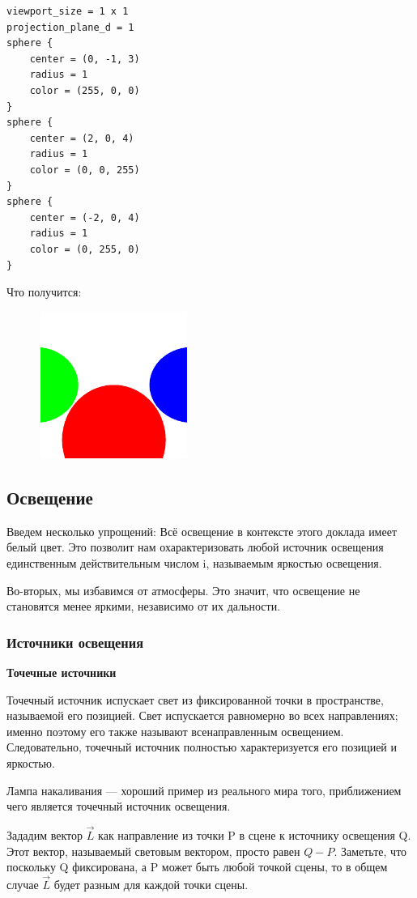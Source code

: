 \begin{lstlisting}
viewport_size = 1 x 1
projection_plane_d = 1
sphere {
    center = (0, -1, 3)
    radius = 1
    color = (255, 0, 0)  
}
sphere {
    center = (2, 0, 4)
    radius = 1
    color = (0, 0, 255)  
}
sphere {
    center = (-2, 0, 4)
    radius = 1
    color = (0, 255, 0)  
}
\end{lstlisting}

Что получится:

\includegraphics[width=7cm, height=4.8cm]{first_example.png}

\subsection{Освещение}
Введем несколько упрощений:
Всё освещение в контексте этого доклада имеет белый цвет. Это позволит нам охарактеризовать любой источник освещения единственным действительным числом i, называемым яркостью освещения.

Во-вторых, мы избавимся от атмосферы. Это значит, что освещение не становятся менее яркими, независимо от их дальности.
\subsubsection{Источники освещения}
\textbf{Точечные источники}

Точечный источник испускает свет из фиксированной точки в пространстве, называемой его позицией. Свет испускается равномерно во всех направлениях; именно поэтому его также называют всенаправленным освещением. Следовательно, точечный источник полностью характеризуется его позицией и яркостью.

Лампа накаливания — хороший пример из реального мира того, приближением чего является точечный источник освещения.

Зададим вектор $\vec{L}$ как направление из точки P в сцене к источнику освещения Q. Этот вектор, называемый световым вектором, просто равен $Q - P$. Заметьте, что поскольку Q фиксирована, а P может быть любой точкой сцены, то в общем случае $\vec{L}$ будет разным для каждой точки сцены.

